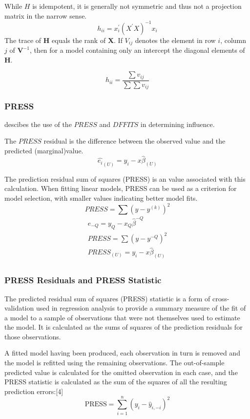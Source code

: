 \documentclass[12pt, a4paper]{report}
\theoremstyle{plain}
\theoremstyle{definition}
\theoremstyle{remark}
\begin{document}
While $H$ is idempotent, it is generally not symmetric and thus not a projection matrix in the narrow sense.
\[ h_{ii} = x^{\prime}_{i}(X^{\prime}X)^{-1}x_{i} \]
The trace of $\boldsymbol{H}$ equals the rank of $\boldsymbol{X}$.
If $V_{ij}$ denotes the element in row $i$, column $j$ of $\boldsymbol{V}^{-1}$, then for a model containing only an intercept the diagonal elements of $\boldsymbol{H}$.

\[ h_{ii} = \frac{\sum v_{ij}}{\sum \sum v_{ij}} \]

\subsubsection{PRESS}
\citet{schabenberger} descibes the use of the $PRESS$ and $DFFITS$ in determining influence.

The $PRESS$ residual is the difference between the observed value and the predicted (marginal)value.
\begin{equation}
\hat{e_{i}}_{(U)} = y_{i} - x\hat{\beta}_{(U)}
\end{equation}

The prediction residual sum of squares (PRESS) is an value associated with this calculation. When fitting linear models, PRESS can be used as a criterion for model selection, with smaller values indicating better model fits.
\begin{equation}
PRESS = \sum(y-y^{(k)})^2
\end{equation}
\begin{eqnarray*}
	e_{-Q} = y_{Q} - x_{Q}\hat{\beta}^{-Q}\\
	PRESS = \sum(y-y^{-Q})^2\\
	PRESS_{(U)} = y_{i} - x\hat{\beta}_{(U)}\\
\end{eqnarray*}

\subsubsection{PRESS Residuals and PRESS Statistic}
The predicted residual sum of squares (PRESS) statistic is a form of cross-validation used in regression analysis to provide a summary measure of the fit of a model to a sample of observations that were not themselves used to estimate the model. It is calculated as the sums of squares of the prediction residuals for those observations.

A fitted model having been produced, each observation in turn is removed and the model is refitted using the remaining observations. The out-of-sample predicted value is calculated for the omitted observation in each case, and the PRESS statistic is calculated as the sum of the squares of all the resulting prediction errors:[4]
\[\mbox{PRESS} =\sum_{i=1}^n (y_i - \hat{y}_{i, -i})^2 \]
\end{document}
